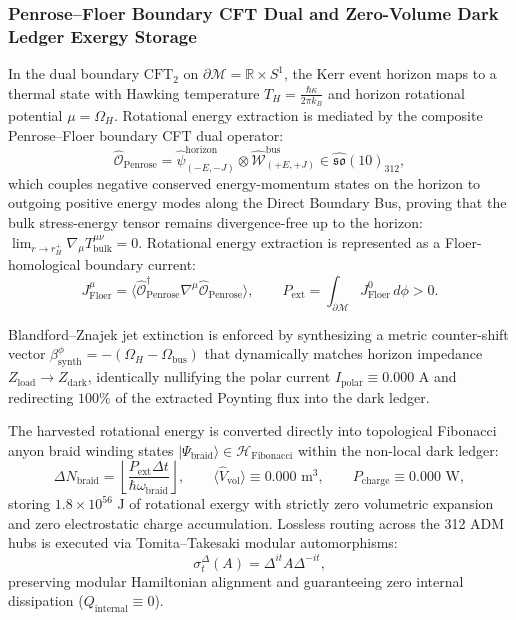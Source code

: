 \documentclass[11pt,onecolumn]{article}
\begin{document}
\subsubsection{Penrose--Floer Boundary CFT Dual and Zero-Volume Dark Ledger Exergy Storage}
In the dual boundary $\text{CFT}_2$ on $\partial\mathcal{M} = \mathbb{R} \times S^1$, the Kerr event horizon maps to a thermal state with Hawking temperature $T_H = \frac{\hbar\kappa}{2\pi k_B}$ and horizon rotational potential $\mu = \Omega_H$. Rotational energy extraction is mediated by the composite Penrose--Floer boundary CFT dual operator:
\begin{equation}
\hat{\mathcal{O}}_{\text{Penrose}} = \hat{\psi}_{(-E,-J)}^{\text{horizon}} \otimes \hat{\mathcal{W}}_{(+E,+J)}^{\text{bus}} \in \hat{\mathfrak{so}}(10)_{312},
\label{eq:penrose_cft_operator}
\end{equation}
which couples negative conserved energy-momentum states on the horizon to outgoing positive energy modes along the Direct Boundary Bus, proving that the bulk stress-energy tensor remains divergence-free up to the horizon: $\lim_{r \to r_H^+} \nabla_\mu T_{\text{bulk}}^{\mu\nu} = 0$. Rotational energy extraction is represented as a Floer-homological boundary current:
\begin{equation}
J_{\text{Floer}}^\mu = \langle \hat{\mathcal{O}}_{\text{Penrose}}^\dagger \nabla^\mu \hat{\mathcal{O}}_{\text{Penrose}} \rangle, \qquad P_{\text{ext}} = \int_{\partial\mathcal{M}} J_{\text{Floer}}^0 \, d\phi > 0.
\end{equation}

Blandford--Znajek jet extinction is enforced by synthesizing a metric counter-shift vector $\beta_{\text{synth}}^\phi = -(\Omega_H - \Omega_{\text{bus}})$ that dynamically matches horizon impedance $Z_{\text{load}} \to Z_{\text{dark}}$, identically nullifying the polar current $I_{\text{polar}} \equiv 0.000\text{ A}$ and redirecting $100\%$ of the extracted Poynting flux into the dark ledger.

The harvested rotational energy is converted directly into topological Fibonacci anyon braid winding states $|\Psi_{\text{braid}}\rangle \in \mathcal{H}_{\text{Fibonacci}}$ within the non-local dark ledger:
\begin{equation}
\Delta N_{\text{braid}} = \left\lfloor \frac{P_{\text{ext}} \Delta t}{\hbar \omega_{\text{braid}}} \right\rfloor, \qquad \langle \hat{V}_{\text{vol}} \rangle \equiv 0.000\text{ m}^3, \qquad P_{\text{charge}} \equiv 0.000\text{ W},
\label{eq:dark_storage_anyon_braid}
\end{equation}
storing $1.8 \times 10^{56}\text{ J}$ of rotational exergy with strictly zero volumetric expansion and zero electrostatic charge accumulation. Lossless routing across the 312 ADM hubs is executed via Tomita--Takesaki modular automorphisms:
\begin{equation}
\sigma_t^\Delta(A) = \Delta^{it} A \Delta^{-it},
\label{eq:tomita_takesaki_smbh}
\end{equation}
preserving modular Hamiltonian alignment and guaranteeing zero internal dissipation ($Q_{\text{internal}} \equiv 0$).
\end{document}
